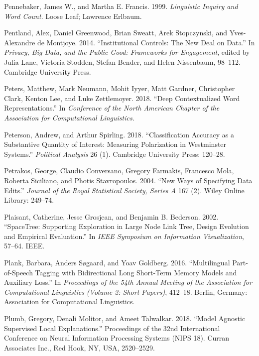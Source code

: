 \documentclass[]{krantz}
\begin{document}
\hypertarget{ref-pennebaker-99}{}
Pennebaker, James W., and Martha E. Francis. 1999. \emph{Linguistic
Inquiry and Word Count}. Loose Leaf; Lawrence Erlbaum.

\hypertarget{ref-Pentland2014}{}
Pentland, Alex, Daniel Greenwood, Brian Sweatt, Arek Stopczynski, and
Yves-Alexandre de Montjoye. 2014. ``Institutional Controls: The New Deal
on Data.'' In \emph{Privacy, Big Data, and the Public Good: Frameworks
for Engagement}, edited by Julia Lane, Victoria Stodden, Stefan Bender,
and Helen Nissenbaum, 98--112. Cambridge University Press.

\hypertarget{ref-peters-18}{}
Peters, Matthew, Mark Neumann, Mohit Iyyer, Matt Gardner, Christopher
Clark, Kenton Lee, and Luke Zettlemoyer. 2018. ``Deep Contextualized
Word Representations.'' In \emph{Conference of the North American
Chapter of the Association for Computational Linguistics}.

\hypertarget{ref-peterson2018classification}{}
Peterson, Andrew, and Arthur Spirling. 2018. ``Classification Accuracy
as a Substantive Quantity of Interest: Measuring Polarization in
Westminster Systems.'' \emph{Political Analysis} 26 (1). Cambridge
University Press: 120--28.

\hypertarget{ref-petrakos2004new}{}
Petrakos, George, Claudio Conversano, Gregory Farmakis, Francesco Mola,
Roberta Siciliano, and Photis Stavropoulos. 2004. ``New Ways of
Specifying Data Edits.'' \emph{Journal of the Royal Statistical Society,
Series A} 167 (2). Wiley Online Library: 249--74.

\hypertarget{ref-plaisant2002spacetree}{}
Plaisant, Catherine, Jesse Grosjean, and Benjamin B. Bederson. 2002.
``SpaceTree: Supporting Exploration in Large Node Link Tree, Design
Evolution and Empirical Evaluation.'' In \emph{IEEE Symposium on
Information Visualization}, 57--64. IEEE.

\hypertarget{ref-plank-16}{}
Plank, Barbara, Anders Søgaard, and Yoav Goldberg. 2016. ``Multilingual
Part-of-Speech Tagging with Bidirectional Long Short-Term Memory Models
and Auxiliary Loss.'' In \emph{Proceedings of the 54th Annual Meeting of
the Association for Computational Linguistics (Volume 2: Short Papers)},
412--18. Berlin, Germany: Association for Computational Linguistics.

\hypertarget{ref-Plumb2018}{}
Plumb, Gregory, Denali Molitor, and Ameet Talwalkar. 2018. ``Model
Agnostic Supervised Local Explanations.'' Proceedings of the 32nd
International Conference on Neural Information Processing Systems (NIPS
18). Curran Associates Inc., Red Hook, NY, USA, 2520--2529.
\end{document}
